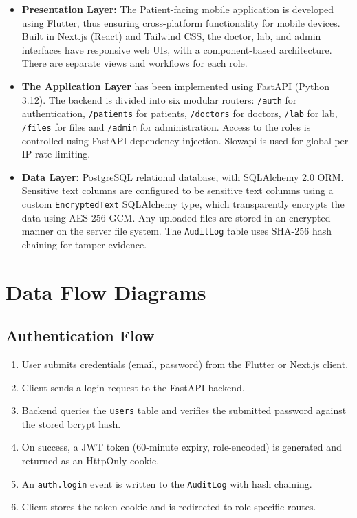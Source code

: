 \documentclass[a4paper,12pt]{report}
\begin{document}
\begin{itemize}
    \item \textbf{Presentation Layer:} The Patient-facing mobile application is developed using Flutter, thus ensuring cross-platform functionality for mobile devices. Built in Next.js (React) and Tailwind CSS, the doctor, lab, and admin interfaces have responsive web UIs, with a component-based architecture. There are separate views and workflows for each role.
    \item \textbf{The Application Layer} has been implemented using FastAPI (Python 3.12). The backend is divided into six modular routers: \texttt{/auth} for authentication, \texttt{/patients} for patients, \texttt{/doctors} for doctors, \texttt{/lab} for lab, \texttt{/files} for files and \texttt{/admin} for administration. Access to the roles is controlled using FastAPI dependency injection. Slowapi is used for global per-IP rate limiting.
    \item \textbf{Data Layer:} PostgreSQL relational database, with SQLAlchemy 2.0 ORM. Sensitive text columns are configured to be sensitive text columns using a custom \texttt{EncryptedText} SQLAlchemy type, which transparently encrypts the data using AES-256-GCM. Any uploaded files are stored in an encrypted manner on the server file system. The \texttt{AuditLog} table uses SHA-256 hash chaining for tamper-evidence.
\end{itemize}

\section{Data Flow Diagrams}

\subsection{Authentication Flow}

\begin{enumerate}
    \item User submits credentials (email, password) from the Flutter or Next.js client.
    \item Client sends a login request to the FastAPI backend.
    \item Backend queries the \texttt{users} table and verifies the submitted password against the stored bcrypt hash.
    \item On success, a JWT token (60-minute expiry, role-encoded) is generated and returned as an HttpOnly cookie.
    \item An \texttt{auth.login} event is written to the \texttt{AuditLog} with hash chaining.
    \item Client stores the token cookie and is redirected to role-specific routes.
\end{enumerate}
\end{document}
